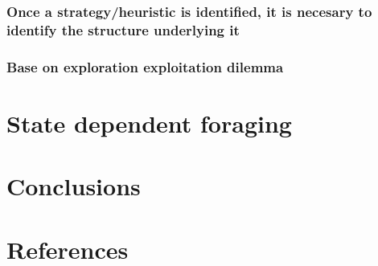 \documentclass[11pt]{article}
\begin{document}
\subsubsection{Once a strategy/heuristic is identified, it is necesary to identify the structure underlying it}
\label{sec:org048f73b}
\subsubsection{Base on exploration exploitation dilemma}
\label{sec:org3c2378c}
\newpage
\section{State dependent foraging}
\label{sec:org51bf4dd}
\newpage
\section{Conclusions}
\label{sec:org3bbea26}
\newpage
\section{References}
\label{sec:orgedbba44}



\end{document}
